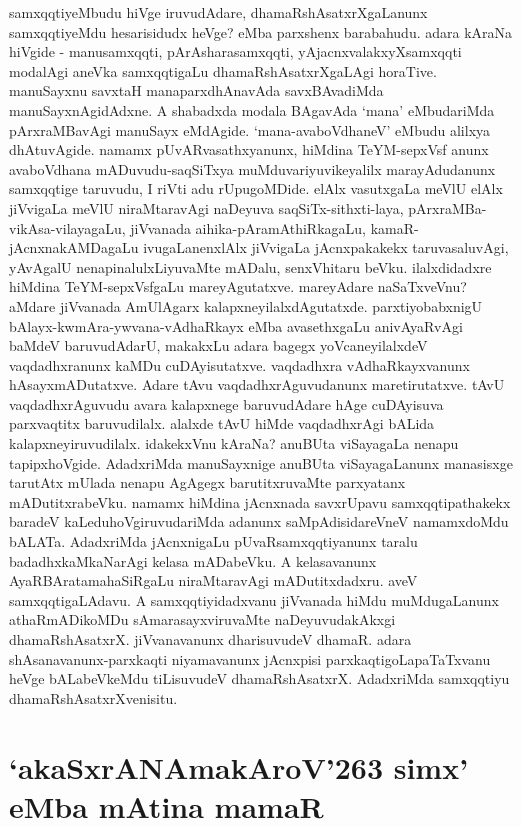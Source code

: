 samxqqtiyeMbudu hiVge iruvudAdare, dhamaRshAsatxrXgaLanunx samxqqtiyeMdu hesarisidudx heVge? eMba parxshenx barabahudu. adara kAraNa hiVgide - manusamxqqti, pArAsharasamxqqti, yAjacnxvalakxyXsamxqqti modalAgi aneVka samxqqtigaLu dhamaRshAsatxrXgaLAgi horaTive. manuSayxnu savxtaH manaparxdhAnavAda savxBAvadiMda manuSayxnAgidAdxne. A shabadxda modala BAgavAda `mana' eMbudariMda pArxraMBavAgi manuSayx eMdAgide. `mana-avaboVdhaneV' eMbudu alilxya dhAtuvAgide. namamx pUvARvasathxyanunx, hiMdina TeYM-sepxVsf anunx avaboVdhana mADuvudu-saqSiTxya muMduvariyuvikeyalilx marayAdudanunx samxqqtige taruvudu, I riVti adu rUpugoMDide. elAlx vasutxgaLa meVlU elAlx jiVvigaLa meVlU niraMtaravAgi naDeyuva saqSiTx-sithxti-laya, pArxraMBa-vikAsa-vilayagaLu, jiVvanada aihika-pAramAthiRkagaLu, kamaR-jAcnxnakAMDagaLu ivugaLanenxlAlx jiVvigaLa jAcnxpakakekx taruvasaluvAgi, yAvAgalU nenapinalulxLiyuvaMte mADalu, senxVhitaru beVku. ilalxdidadxre hiMdina TeYM-sepxVsfgaLu mareyAgutatxve. mareyAdare naSaTxveVnu? aMdare jiVvanada AmUlAgarx kalapxneyilalxdAgutatxde. parxtiyobabxnigU bAlayx-kwmAra-ywvana-vAdhaRkayx eMba avasethxgaLu anivAyaRvAgi baMdeV baruvudAdarU, makakxLu adara bagegx yoVcaneyilalxdeV vaqdadhxranunx kaMDu cuDAyisutatxve. vaqdadhxra vAdhaRkayxvanunx hAsayxmADutatxve. Adare tAvu vaqdadhxrAguvudanunx maretirutatxve. tAvU vaqdadhxrAguvudu avara kalapxnege baruvudAdare hAge cuDAyisuva parxvaqtitx baruvudilalx. alalxde tAvU hiMde vaqdadhxrAgi bALida kalapxneyiruvudilalx. idakekxVnu kAraNa? anuBUta viSayagaLa nenapu tapipxhoVgide. AdadxriMda manuSayxnige anuBUta viSayagaLanunx manasisxge tarutAtx mUlada nenapu AgAgegx barutitxruvaMte parxyatanx mADutitxrabeVku. namamx hiMdina jAcnxnada savxrUpavu samxqqtipathakekx baradeV kaLeduhoVgiruvudariMda adanunx saMpAdisidareVneV namamxdoMdu bALATa. AdadxriMda jAcnxnigaLu pUvaRsamxqqtiyanunx taralu badadhxkaMkaNarAgi kelasa mADabeVku. A kelasavanunx AyaRBAratamahaSiRgaLu niraMtaravAgi mADutitxdadxru. aveV samxqqtigaLAdavu. A samxqqtiyidadxvanu jiVvanada hiMdu muMdugaLanunx athaRmADikoMDu sAmarasayxviruvaMte naDeyuvudakAkxgi dhamaRshAsatxrX. jiVvanavanunx dharisuvudeV dhamaR. adara shAsanavanunx-parxkaqti niyamavanunx jAcnxpisi parxkaqtigoLapaTaTxvanu heVge bALabeVkeMdu tiLisuvudeV dhamaRshAsatxrX. AdadxriMda samxqqtiyu dhamaRshAsatxrXvenisitu.

\section*{`akaSxrANAmakAroV\char'263 simx' eMba mAtina mamaR}
\label{95}


